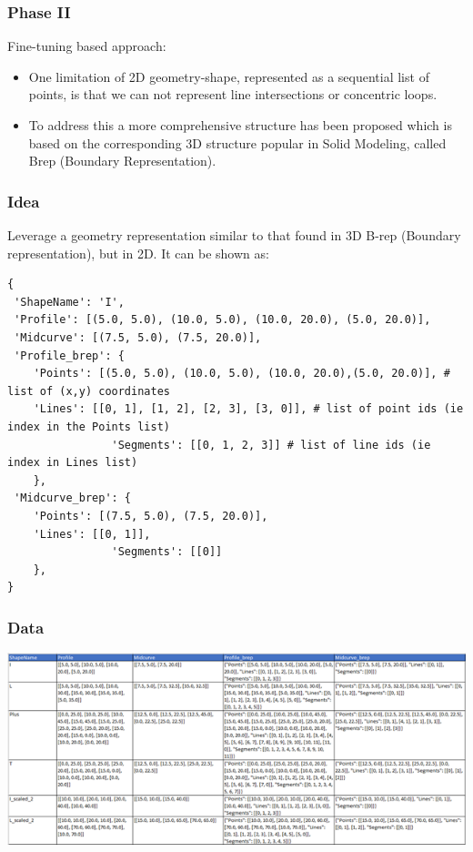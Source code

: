 \begin{frame}[fragile]\frametitle{Phase II}

Fine-tuning based approach:

\begin{itemize}
\item One limitation of 2D geometry-shape, represented as a sequential list of points, is that we can not represent line intersections or concentric loops. 
\item To address this a more comprehensive structure has been proposed which is based on the corresponding 3D structure popular in Solid Modeling, called Brep (Boundary Representation).
\end{itemize}	

\end{frame}


\begin{frame}[fragile]\frametitle{Idea}

Leverage a geometry representation similar to that found in 3D B-rep (Boundary representation), but in 2D. It can be shown as:

\begin{lstlisting}
{
 'ShapeName': 'I',
 'Profile': [(5.0, 5.0), (10.0, 5.0), (10.0, 20.0), (5.0, 20.0)],
 'Midcurve': [(7.5, 5.0), (7.5, 20.0)],
 'Profile_brep': {
    'Points': [(5.0, 5.0), (10.0, 5.0), (10.0, 20.0),(5.0, 20.0)], # list of (x,y) coordinates
    'Lines': [[0, 1], [1, 2], [2, 3], [3, 0]], # list of point ids (ie index in the Points list)
                'Segments': [[0, 1, 2, 3]] # list of line ids (ie index in Lines list)
    },
 'Midcurve_brep': {
    'Points': [(7.5, 5.0), (7.5, 20.0)],
    'Lines': [[0, 1]],
                'Segments': [[0]]
    },    
}
\end{lstlisting}	
\end{frame}

\begin{frame}[fragile]\frametitle{Data}

         \begin{center}
	\includegraphics[width=\linewidth]{images/shapes_csv}
	\label{fig_csv}
    \end{center}
	
\end{frame}

